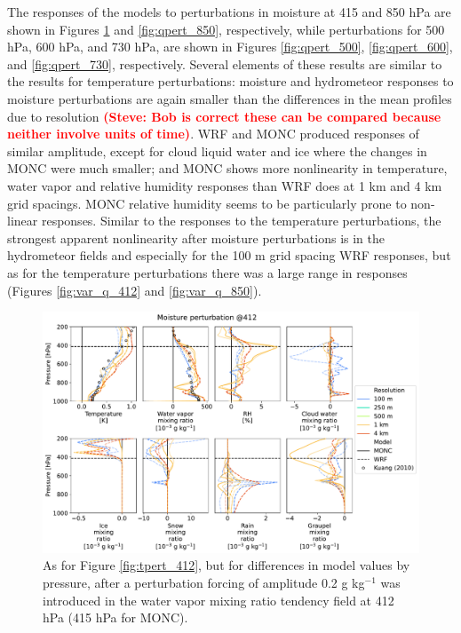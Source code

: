 \documentclass[draft]{agujournal2019}
\newcommand{\todo}[1]{\textcolor{red}{\textbf{(#1)}}}
\begin{document}
The responses of the models to perturbations in moisture at 415 and 850 hPa
are shown in Figures \ref{fig:qpert_412} and \ref{fig:qpert_850}, respectively,
while perturbations for 500 hPa, 600 hPa, and 730 hPa, are shown in Figures
\ref{fig:qpert_500}, \ref{fig:qpert_600}, and \ref{fig:qpert_730}, respectively.
Several elements of these results are similar to the results for temperature
perturbations: moisture and hydrometeor responses to moisture perturbations are
again smaller than the differences in the mean profiles due to resolution
\todo{Steve: Bob is correct these can be compared because neither involve units
of time}. WRF and MONC produced responses of similar amplitude, except for cloud
liquid water and ice where the changes in MONC were much smaller; and MONC shows
more nonlinearity in temperature, water vapor and relative humidity responses
than WRF does at 1 km and 4 km grid spacings. MONC relative humidity seems to be
particularly prone to non-linear responses. Similar to the responses to the
temperature perturbations, the strongest apparent nonlinearity after moisture
perturbations is in the hydrometeor fields and especially for the 100 m grid
spacing WRF responses, but as for the temperature perturbations there was a
large range in responses (Figures \ref{fig:var_q_412} and \ref{fig:var_q_850}).

\begin{figure}[pth]
    \noindent\includegraphics[width=\textwidth]{figures/pert_diffs_q_0.0002_@412}
    \caption{As for Figure \ref{fig:tpert_412}, but for differences in model
    values by pressure, after a perturbation forcing of amplitude 0.2 g kg$^{-1}$ was introduced
    in the water vapor mixing ratio tendency field at 412 hPa (415 hPa for MONC).}
    \label{fig:qpert_412}
\end{figure}
\end{document}
